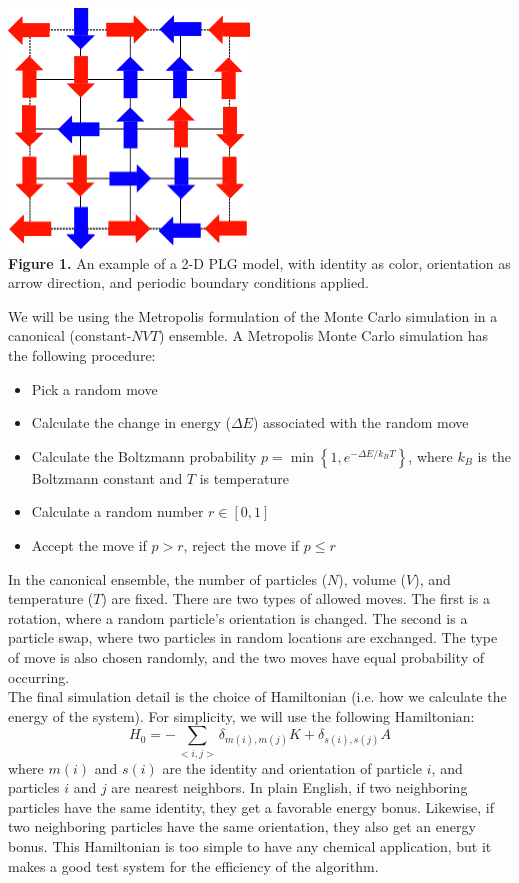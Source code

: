\documentclass{article}
\begin{document}
\vspace{-5pt}
\begin{center}
\includegraphics[scale=0.5]{PLG.png}\\
\textbf{Figure 1.} An example of a 2-D PLG model, with identity as color, orientation as arrow direction, and periodic boundary conditions applied.
\end{center}


\newpage


We will be using the Metropolis formulation of the Monte Carlo simulation in a canonical (constant-$NVT$) ensemble. A Metropolis Monte Carlo simulation has the following procedure:
\begin{itemize}
\item Pick a random move
\item Calculate the change in energy ($\Delta E$) associated with the random move
\item Calculate the Boltzmann probability $p = \min\left\{1, e^{-\Delta E/k_B T}\right\}$, where $k_B$ is the Boltzmann constant and $T$ is temperature
\item Calculate a random number $r \in [0,1]$
\item Accept the move if $p > r$, reject the move if $p \leq r$
\end{itemize}
\indent\indent In the canonical ensemble, the number of particles ($N$), volume ($V$), and temperature ($T$) are fixed. There are two types of allowed moves. The first is a rotation, where a random particle's orientation is changed. The second is a particle swap, where two particles in random locations are exchanged. The type of move is also chosen randomly, and the two moves have equal probability of occurring.\\
\indent The final simulation detail is the choice of Hamiltonian (i.e. how we calculate the energy of the system). For simplicity, we will use the following Hamiltonian:
$$H_0 = - \sum_{<i,j>}\delta_{m(i),m(j)} K + \delta_{s(i),s(j)} A$$
where $m(i)$ and $s(i)$ are the identity and orientation of particle $i$, and particles $i$ and $j$ are nearest neighbors. In plain English, if two neighboring particles have the same identity, they get a favorable energy bonus. Likewise, if two neighboring particles have the same orientation, they also get an energy bonus. This Hamiltonian is too simple to have any chemical application, but it makes a good test system for the efficiency of the algorithm.
\end{document}
